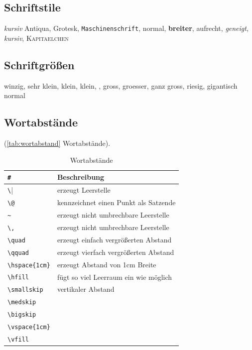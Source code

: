 \subsection{Schriftstile}\label{sec:schriftstile}

\emph{kursiv}
\textrm{Antiqua}, \textsf{Grotesk}, \texttt{Maschinenschrift},
\textmd{normal}, \textbf{breiter}, \textup{aufrecht}, \textsl{geneigt},
\textit{kursiv}, \textsc{Kapitaelchen}

\subsection{Schriftgrößen}

\tiny{winzig}, \scriptsize{sehr klein}, \footnotesize{klein},
\small{klein}, , \large{gross}, \Large{groesser},
\LARGE{ganz gross}, \huge{riesig}, \Huge{gigantisch} \normalsize{normal}

\subsection{Wortabstände}\label{sec:Wortabstaende}

(\autoref{tab:wortabstand} Wortabstände).
\begin{table}[!hb] %
	\centering
	\begin{tabular} {ll}
		\toprule %
			\verb|#| & \textbf{Beschreibung} \\
		\midrule
			\verb|\| & erzeugt Leerstelle \\
			\verb|\@| & kennzeichnet einen Punkt als Satzende \\
			\verb|~| & erzeugt nicht umbrechbare Leerstelle \\
			\verb|\,| & erzeugt nicht umbrechbare Leerstelle \\
			\verb|\quad| & erzeugt einfach vergrößerten Abstand \\
			\verb|\qquad| & erzeugt vierfach vergrößerten Abstand \\
			\verb|\hspace{1cm}| & erzeugt Abstand von 1cm Breite \\
			\verb|\hfill| & fügt so viel Leerraum ein wie möglich \\
			\verb|\smallskip| & vertikaler Abstand\\
			\verb|\medskip| & \\
			\verb|\bigskip| & \\
			\verb|\vspace{1cm}| & \\
			\verb|\vfill| & \\
		\bottomrule
	\end{tabular}
		\caption{Wortabstände }	%
		\label{tab:wortabstand}	%
\end{table}

